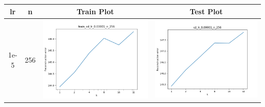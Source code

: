 \documentclass[12pt]{report}
\begin{document}
\begin{table}[H]
  \centering
  \begin{tabular}{ | c | c | c | c |}
    \hline
    \textbf{lr} & \textbf{n} & \textbf{Train Plot} & \textbf{Test Plot} \\ \hline
    1e-5 & 256 &
    \begin{minipage}{.3\textwidth}
      \includegraphics[scale=0.25]{train_cd_lr_0_00001_n_256.png}
    \end{minipage} &
    \begin{minipage}{.3\textwidth}
      \includegraphics[scale=0.25]{cd_lr_0_00001_n_256.png}
    \end{minipage}
    \\ \hline

\end{tabular}
\end{table}
\end{document}
